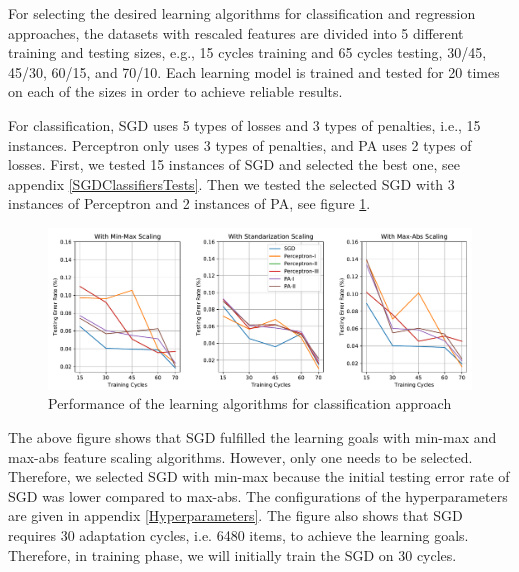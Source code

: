 \documentclass[a4paper,12pt]{article}
\begin{document}
For selecting the desired learning algorithms for classification and regression approaches, the datasets with rescaled features are divided into 5 different training and testing sizes, e.g., 15 cycles training and 65 cycles testing, 30/45, 45/30, 60/15, and 70/10. Each learning model is trained and tested for 20 times on each of the sizes in order to achieve reliable results. 

For classification, SGD uses 5 types of losses and 3 types of penalties, i.e., 15 instances. Perceptron only uses 3 types of penalties, and PA uses 2 types of losses. First, we tested 15 instances of SGD and selected the best one, see appendix \ref{SGDClassifiersTests}. Then we tested the selected SGD with 3 instances of Perceptron and 2 instances of PA, see figure \ref{Classifiers}.
\begin{figure}[H]
	\centering
	\includegraphics[keepaspectratio, width=\linewidth]{graphs/ClassificationModelSelection.pdf}
	\caption{Performance of the learning algorithms for classification approach}
	\label{Classifiers}
\end{figure}
The above figure shows that SGD fulfilled the learning goals with min-max and max-abs feature scaling algorithms. However, only one needs to be selected. Therefore, we selected SGD with min-max because the initial testing error rate of SGD was lower compared to max-abs. The configurations of the hyperparameters are given in appendix \ref{Hyperparameters}. The figure also shows that SGD requires 30 adaptation cycles, i.e. 6480 items, to achieve the learning goals. Therefore, in training phase, we will initially train the SGD on 30 cycles.
\end{document}
